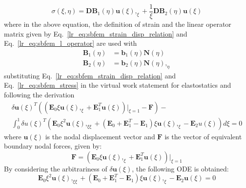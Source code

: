 \begin{equation}
    \sigma(\xi,\eta) =  \mathbf{DB}_1(\eta) \mathbf{u}(\xi),_{\xi} +
                        \frac{1}{\xi} \mathbf{DB}_2(\eta) \mathbf{u}(\xi)
    \label{lr_eq:sbfem_stress}
\end{equation}
%
where in the above equation, the definition of strain and the linear operator matrix given by Eq.~\ref{lr_eq:sbfem_strain_disp_relation} and Eq.~\ref{lr_eq:sbfem_l_operator} are used with
\begin{equation}
    \begin{aligned}
        \mathbf{B}_1(\eta) &= \mathbf{b}_1(\eta) \mathbf{N}(\eta)    \\
        \mathbf{B}_2(\eta) &= \mathbf{b}_2(\eta) \mathbf{N}(\eta),_{\eta}
        \label{lr_eq:sbfem_captial_b}
    \end{aligned}
\end{equation}
%
substituting Eq.~\ref{lr_eq:sbfem_strain_disp_relation} and Eq.~\ref{lr_eq:sbfem_stress} in the virtual work statement for elastostatics \citep{Deeks2002} and following the derivation
\begin{equation}
    \begin{aligned}
        \delta \mathbf{u}(\xi)^{T} \left(
            (\mathbf{E}_0 \xi \mathbf{u}(\xi),_{\xi}
            + \mathbf{E}_1^T \mathbf{u}(\xi))|_{\xi=1}
            - \mathbf{F}
        \right) - \\
        \int_0^1 \delta u(\xi)^T\left(
            \mathbf{E}_0 \xi^2 \mathbf{u}(\xi),_{\xi\xi} + (\mathbf{E}_0 + \mathbf{E}_1^T - \mathbf{E}_1) \xi \mathbf{u}(\xi),_{\xi}
            - \mathbf{E}_2 u(\xi)
        \right) d\xi = 0
    \end{aligned}
    \label{lr_eq:sbfem_virtual_work}
\end{equation}
%
where $\mathbf{u}(\xi)$ is the nodal displacement vector and $\mathbf{F}$ is the vector of equivalent boundary nodal forces, given by:
\begin{equation}
    \mathbf{F} = (\mathbf{E}_0 \xi \mathbf{u}(\xi),_{\xi} + \mathbf{E}_1^T \mathbf{u}(\xi))|_{\xi=1}
    \label{lr_eq:sbfem_nodal forces}
\end{equation}
%
By considering the arbitrariness of $\delta \mathbf{u}(\xi)$, the following ODE is obtained:
\begin{equation}
    \mathbf{E}_0 \xi^2 \mathbf{u}(\xi),_{\xi\xi} + (\mathbf{E}_0 + \mathbf{E}_1^T - \mathbf{E}_1)\xi \mathbf{u}(\xi),_{\xi} - \mathbf{E}_2 \mathbf{u}(\xi) = 0
    \label{lr_eq:sbfem_ODE}
\end{equation}
